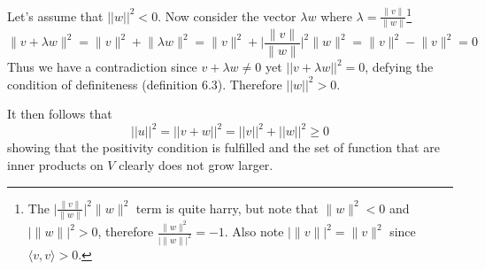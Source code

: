 \documentclass{article}
\providecommand{\abs}[1]{\lvert#1\rvert} \providecommand{\norm}[1]{\lVert#1\rVert}
\begin{document}
Let's assume that $||w||^2 < 0$. 
Now consider the vector $\lambda w$ where $\lambda=\frac{\norm{v}}{\norm{w}}$\footnote{
The $\abs{\frac{\norm{v}}{\norm{w}}}^2 \norm{w}^2$ term is quite harry, but note that $\norm{w}^2 < 0$ and $\abs{\norm{w}}^2 > 0$, therefore $\frac{\norm{w}^2}{\abs{\norm{w}}^2} = -1 $. Also note $\abs{\norm{v}}^2 = \norm{v}^2$ since $\langle v, v\rangle > 0$.
}
\[\norm{v+\lambda w}^2=\norm{v}^2+\norm{\lambda w}^2 = \norm{v}^2+\abs{\frac{\norm{v}}{\norm{w}}}^2 \norm{w}^2 = \norm{v}^2 - \norm{v}^2 = 0 \]
Thus we have a contradiction since $v+\lambda w\neq0$ yet $||v+\lambda w||^2=0$, defying the condition of definiteness (definition 6.3). Therefore $||w||^2 > 0$.

It then follows that 
\[||u||^2 = ||v+w||^2=||v||^2+||w||^2 \geq 0\]
showing that the positivity condition is fulfilled and the set of function that are inner products on $V$ clearly does not grow larger.
\end{document}
